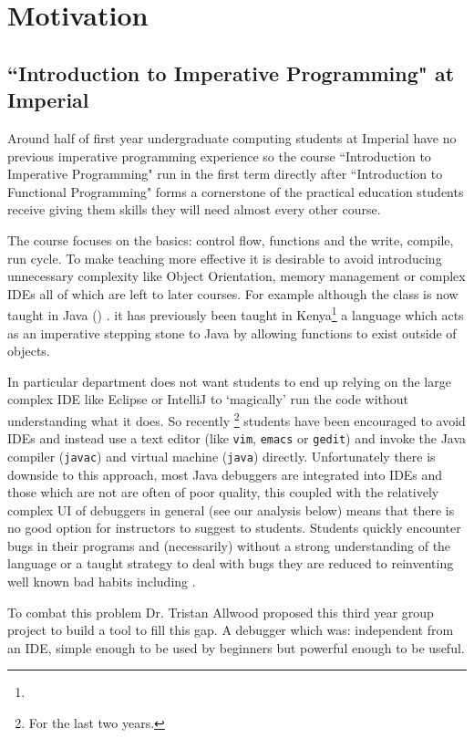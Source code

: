 \documentclass[11pt, a4paper]{article}
\newcommand{\cmd}[1]{{\tt #1}}
\begin{document}
\clearpage
\tableofcontents
\clearpage

\section{Motivation}
\subsection{``Introduction to Imperative Programming" at Imperial}
Around half of first year undergraduate computing students at Imperial have no previous imperative programming experience\cite{projectproposal} so the course ``Introduction to Imperative Programming" run in the first term directly after ``Introduction to Functional Programming" forms a cornerstone of the practical education students receive giving them skills they will need almost every other course.

The course focuses on the basics: control flow, functions and the write, compile, run cycle.
To make teaching more effective it is desirable to avoid introducing unnecessary complexity like Object Orientation, memory management or complex IDEs all of which are left to later courses.
For example although the class is now taught in Java () . it has previously been taught in Kenya\footnote{} a language which acts as an imperative stepping stone to Java by allowing functions to exist outside of objects.

In particular department does not want students to end up relying on the large complex IDE like Eclipse or IntelliJ to `magically' run the code without understanding what it does.
So recently  \footnote{For the last two years.} students have been encouraged to avoid IDEs and instead use a text editor (like \cmd{vim}, \cmd{emacs} or \cmd{gedit}) and invoke the Java compiler (\cmd{javac}) and virtual machine (\cmd{java}) directly.
Unfortunately there is downside to this approach, most Java debuggers are integrated into IDEs and those which are not are often of poor quality, this coupled with the relatively complex UI of debuggers in general (see our analysis below) means that there is no good option for instructors to suggest to students.
Students quickly encounter bugs in their programs and (necessarily) without a strong understanding of the language or a taught strategy to deal with bugs they are reduced to reinventing well known bad habits including .

To combat this problem Dr. Tristan Allwood proposed\cite{projectproposal} this third year group project to build a tool to fill this gap.
A debugger which was: independent from an IDE, simple enough to be 	used by beginners but powerful enough to be useful.
\end{document}
